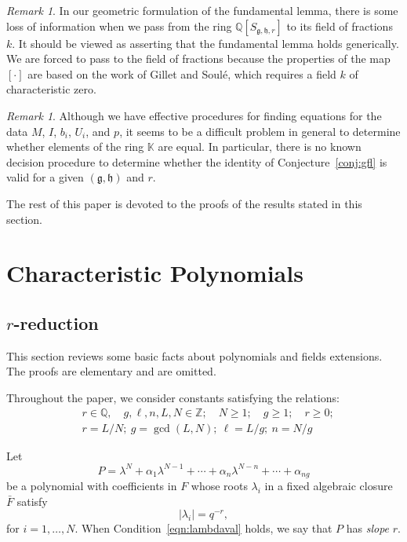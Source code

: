 \documentclass[11pt]{amsart}
\theoremstyle{definition}
\theoremstyle{remark}
\newtheorem{remark}[theorem]{Remark}
\numberwithin{equation}{theorem}
\newcommand{\ring}[1]{\mathbb{#1}}
\def\lie#1{{\mathfrak{#1}}}
\begin{document}
\begin{remark} In our geometric formulation of the fundamental lemma,
there is some loss of information when we pass from the ring
$\ring{Q}[S_{\lie{g},\lie{h},r}]$ to its field of fractions $k$.
It should be viewed as asserting that the fundamental lemma holds
generically.  We are forced to pass to the field of fractions
because the properties of the map $[\cdot]$ are based on the work
of Gillet and Soul\'e, which requires a field $k$ of
characteristic zero.
\end{remark}

\begin{remark} Although we have effective procedures for finding equations
for the data $M$, $I$, $b_i$, $U_i$, and $p$, it seems to be a
difficult problem in general to determine whether elements of the
ring $\ring{K}$ are equal. In particular, there is no known
decision procedure to determine whether the identity of
Conjecture~\ref{conj:gfl} is valid for a given $(\lie{g},\lie{h})$
and $r$.
\end{remark}

The rest of this paper is devoted to the proofs of the results
stated in this section.


\section{Characteristic Polynomials}


\subsection{$r$-reduction}


This section reviews some basic facts about polynomials and fields
extensions.
The proofs are elementary and are omitted.

Throughout the paper, we consider constants satisfying the
relations:
   \begin{equation}\begin{array}{lll}
   &r\in\ring{Q},\quad g,\ell,n,L,N\in\ring{Z};\quad N\ge1;\quad g\ge1;
   \quad r\ge0;\\
   &r=L/N;\ g=\gcd(L,N);\ \ell = L/g;\ n = N/g
   \end{array}
   \label{eqn:constants}
   \end{equation}


Let
\begin{equation}P = \lambda^N + \alpha_1 \lambda^{N-1} +\cdots + \alpha_n
\lambda^{N-n} + \cdots +
\alpha_{n g}\end{equation} be a polynomial with coefficients in
$F$ whose roots $\lambda_i$ in a fixed algebraic closure $\bar F$
satisfy
    \begin{equation}
    |\lambda_i| = q^{-r},
    \label{eqn:lambdaval}
    \end{equation}
for $i=1,\ldots,N$.  When Condition~\ref{eqn:lambdaval} holds, we
say that $P$ has {\it slope} $r$.
\end{document}
